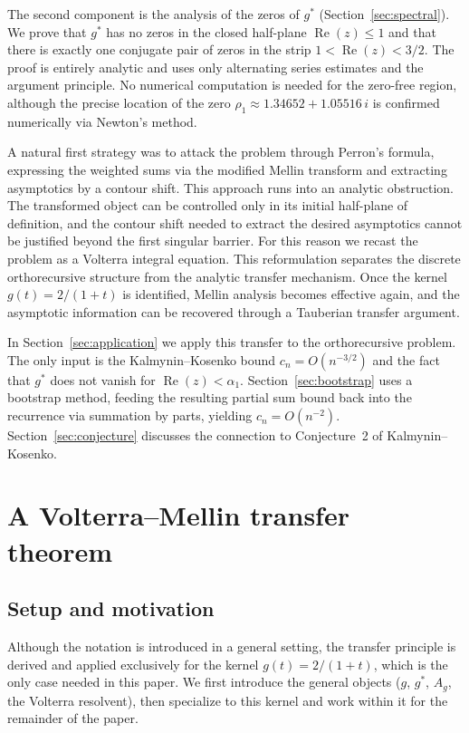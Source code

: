 \documentclass[11pt]{amsart}
\theoremstyle{definition}
\theoremstyle{remark}
\newcommand{\Real}{\operatorname{Re}}
\begin{document}
The second component is the analysis of the zeros of $g^*$ (Section~\ref{sec:spectral}). We prove that $g^*$ has no zeros in the closed half-plane $\Real(z) \leq 1$ and that there is exactly one conjugate pair of zeros in the strip $1 < \Real(z) < 3/2$. The proof is entirely analytic and uses only alternating series estimates and the argument principle. No numerical computation is needed for the zero-free region, although the precise location of the zero $\rho_1 \approx 1.34652 + 1.05516\,i$ is confirmed numerically via Newton's method.

A natural first strategy was to attack the problem through Perron's formula, expressing the weighted sums via the modified Mellin transform and extracting asymptotics by a contour shift. This approach runs into an analytic obstruction. The transformed object can be controlled only in its initial half-plane of definition, and the contour shift needed to extract the desired asymptotics cannot be justified beyond the first singular barrier. For this reason we recast the problem as a Volterra integral equation. This reformulation separates the discrete orthorecursive structure from the analytic transfer mechanism. Once the kernel $g(t) = 2/(1+t)$ is identified, Mellin analysis becomes effective again, and the asymptotic information can be recovered through a Tauberian transfer argument.

In Section~\ref{sec:application} we apply this transfer to the orthorecursive problem. The only input is the Kalmynin--Kosenko bound $c_n = O(n^{-3/2})$ and the fact that $g^*$ does not vanish for $\Real(z) < \alpha_1$. Section~\ref{sec:bootstrap} uses a bootstrap method, feeding the resulting partial sum bound back into the recurrence via summation by parts, yielding $c_n = O(n^{-2})$. Section~\ref{sec:conjecture} discusses the connection to Conjecture~2 of Kalmynin--Kosenko.


\section{A Volterra--Mellin transfer theorem}\label{sec:transfer}

\subsection{Setup and motivation}

Although the notation is introduced in a general setting, the transfer principle is derived and applied exclusively for the kernel $g(t) = 2/(1+t)$, which is the only case needed in this paper. We first introduce the general objects ($g$, $g^*$, $A_g$, the Volterra resolvent), then specialize to this kernel and work within it for the remainder of the paper.
\end{document}
